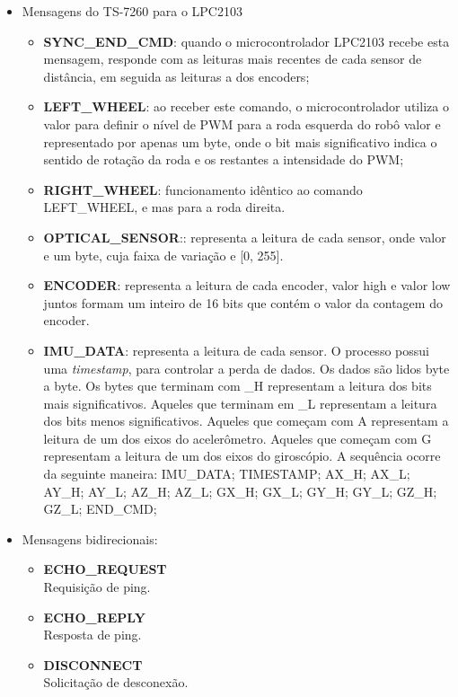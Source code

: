 \begin{itemize}
  \item Mensagens do TS-7260 para o LPC2103
		\begin{itemize}
	  \item \textbf{SYNC\_END\_CMD}: quando o microcontrolador LPC2103 recebe esta mensagem, responde com as leituras mais recentes de cada sensor de distância, em seguida as leituras a dos encoders;
	  \item \textbf{LEFT\_WHEEL}: ao receber este comando, o microcontrolador utiliza o valor para definir o nível de PWM para a roda esquerda do robô valor e representado por apenas um byte, onde o bit mais significativo indica o sentido de rotação da roda e os restantes a intensidade do PWM;
	  \item \textbf{RIGHT\_WHEEL}: funcionamento idêntico ao comando LEFT\_WHEEL, e mas para a roda direita.
	  \item \textbf{OPTICAL\_SENSOR}:: representa a leitura de cada sensor, onde valor e um byte, cuja faixa de variação e [0, 255].
	  \item \textbf{ENCODER}: representa a leitura de cada encoder, valor high e valor low juntos formam um inteiro de 16 bits que contém o valor da contagem do encoder.
	  \item \textbf{IMU\_DATA}: representa a leitura de cada sensor. O processo possui uma \textit{timestamp}, para controlar a perda de dados. Os dados são lidos byte a byte. Os bytes que terminam com \_H representam a leitura dos bits mais significativos. Aqueles que terminam em \_L representam a leitura dos bits menos significativos. Aqueles que começam com A representam a leitura de um dos eixos do acelerômetro. Aqueles que começam com G representam a leitura de um dos eixos do giroscópio. A sequência ocorre da seguinte maneira: IMU\_DATA; TIMESTAMP; AX\_H; AX\_L; AY\_H; AY\_L; AZ\_H; AZ\_L; GX\_H; GX\_L; GY\_H; GY\_L; GZ\_H; GZ\_L; END\_CMD;
	\end{itemize}

  \item Mensagens bidirecionais:

    \begin{itemize}
      \item \textbf{ECHO\_REQUEST}\\
	Requisição de ping.
      \item \textbf{ECHO\_REPLY}\\
	Resposta de ping.
      \item \textbf{DISCONNECT} \\
	Solicitação de desconexão.
    \end{itemize}


\end{itemize}
